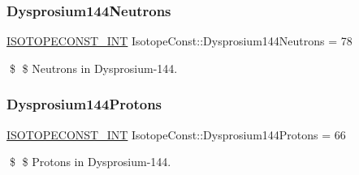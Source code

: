 \subsubsection{\texorpdfstring{Dysprosium144\+Neutrons}{Dysprosium144Neutrons}}
{\footnotesize\ttfamily \mbox{\hyperlink{group___isotope_const-_macros_ga5f18360b3e99483a35c32d789e62621c}{I\+S\+O\+T\+O\+P\+E\+C\+O\+N\+S\+T\+\_\+\+I\+NT}} Isotope\+Const\+::\+Dysprosium144\+Neutrons = 78}

\$ \$ Neutrons in Dysprosium-\/144. \mbox{\label{group___isotope_const-_dysprosium-_dy144_ga572b32eb6c1c9975a5da644d22f0d3c2}} 
\subsubsection{\texorpdfstring{Dysprosium144\+Protons}{Dysprosium144Protons}}
{\footnotesize\ttfamily \mbox{\hyperlink{group___isotope_const-_macros_ga5f18360b3e99483a35c32d789e62621c}{I\+S\+O\+T\+O\+P\+E\+C\+O\+N\+S\+T\+\_\+\+I\+NT}} Isotope\+Const\+::\+Dysprosium144\+Protons = 66}

\$ \$ Protons in Dysprosium-\/144. 
